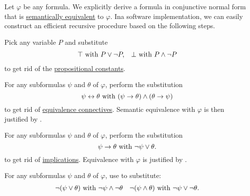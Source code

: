 \begin{algorithm}\label{alg:conjunctive_normal_form_reduction}
  Let \( \varphi \) be any formula. We explicitly derive a formula in conjunctive normal form that is \hyperref[def:propositional_semantics/equivalence]{semantically equivalent} to \( \varphi \). Ina software implementation, we can easily construct an efficient recursive procedure based on the following steps.

  \begin{AlgEnum}
     Pick any variable \( P \) and substitute
    \begin{align*}
      \top \text{ with } P \vee \neg P, && \bot \text{ with } P \wedge \neg P
    \end{align*}
    to get rid of the \hyperref[def:propositional_alphabet/constants]{propositional constants}.

     For any subformulas \( \psi \) and \( \theta \) of \( \varphi \), perform the substitution
    \begin{equation*}
      \psi \leftrightarrow \theta \text{ with } (\psi \rightarrow \theta) \wedge (\theta \rightarrow \psi)
    \end{equation*}
    to get rid of \hyperref[def:propositional_alphabet/connectives/equivalence]{equivalence connectives}. Semantic equivalence with \( \varphi \) is then justified by .

     For any subformulas \( \psi \) and \( \theta \) of \( \varphi \), perform the substitution
    \begin{equation*}
      \psi \rightarrow \theta \text{ with } \neg \psi \vee \theta.
    \end{equation*}
    to get rid of \hyperref[def:propositional_alphabet/connectives/implication]{implications}. Equivalence with \( \varphi \) is justified by .

     For any subformulas \( \psi \) and \( \theta \) of \( \varphi \), use  to substitute:
    \begin{align*}
      \neg(\psi \vee \theta) \text{ with } \neg \psi \wedge \neg \theta
      &&
      \neg(\psi \wedge \theta) \text{ with } \neg \psi \vee \neg \theta.
    \end{align*}


\end{AlgEnum}
\end{algorithm}
